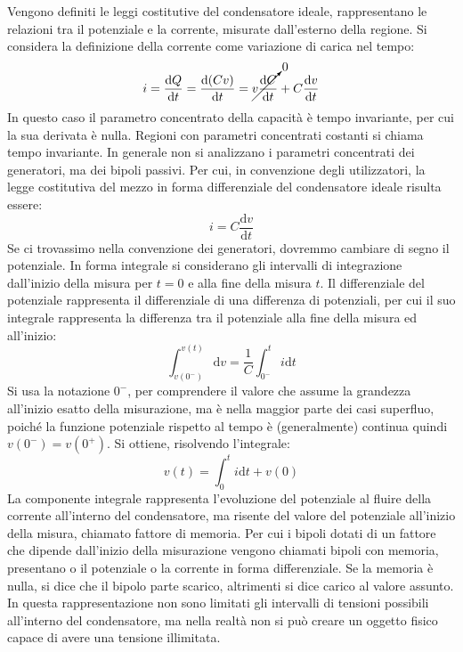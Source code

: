\documentclass{article}
\newcommand{\df}{\mathrm{d}}
\numberwithin{equation}{subsection}
\begin{document}
Vengono definiti le leggi costitutive del condensatore ideale, rappresentano le relazioni tra il potenziale e la corrente, misurate dall'esterno della regione. 
Si considera la definizione della corrente come variazione di carica nel tempo:
\begin{equation*}
    i=\displaystyle\frac{\df Q}{\df t}=\frac{\df(Cv)}{\df t}=\cancelto{0}{v\frac{\df C}{\df t}}+C\frac{\df v}{\df t}
\end{equation*}
In questo caso il parametro concentrato della capacità è tempo invariante, per cui la sua derivata è nulla. Regioni con parametri concentrati costanti si chiama tempo 
invariante. In generale non si analizzano i parametri concentrati dei generatori, ma dei bipoli passivi. Per cui, in convenzione degli utilizzatori, la legge costitutiva del 
mezzo in forma differenziale del condensatore ideale risulta essere:
\begin{equation}
    i=\displaystyle C\frac{\df v}{\df t}
\end{equation}
Se ci trovassimo nella convenzione dei generatori, dovremmo cambiare di segno il potenziale. In forma integrale si considerano gli intervalli di integrazione dall'inizio 
della misura per $t=0$ e alla fine della misura $t$. Il differenziale del potenziale rappresenta il differenziale di una differenza di potenziali, per cui il suo integrale rappresenta la differenza tra il potenziale alla fine della misura ed all'inizio:
\begin{equation*}
    \displaystyle\int_{v(0^-)}^{v(t)}\df v=\frac{1}{C}\int_{0^-}^ti\df t
\end{equation*}
Si usa la notazione $0^-$, per comprendere il valore che assume la grandezza all'inizio esatto della misurazione, ma è nella maggior parte dei casi superfluo, poiché la funzione 
potenziale rispetto al tempo è (generalmente) continua quindi $v(0^-)=v(0^+)$. Si ottiene, risolvendo l'integrale:
\begin{equation*}
    v(t)=\displaystyle\int_0^ti\df t+v(0)
\end{equation*}
La componente integrale rappresenta l'evoluzione del potenziale al fluire della corrente all'interno del condensatore, ma risente del valore del potenziale all'inizio della misura, 
chiamato fattore di memoria. Per cui i bipoli dotati di un fattore che dipende dall'inizio della misurazione vengono chiamati bipoli con memoria, presentano o il potenziale 
o la corrente in forma differenziale. Se la memoria è nulla, si dice che il bipolo parte scarico, altrimenti si dice carico al valore assunto. In questa rappresentazione non 
sono limitati gli intervalli di tensioni possibili all'interno del condensatore, ma nella realtà non si può creare un oggetto fisico capace di avere una tensione illimitata. 
\end{document}
